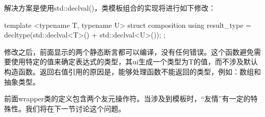 解决方案是使用std::declval()，类模板组合的实现将进行如下修改：

\begin{cppcode}
template <typename T, typename U>
struct composition
{
	using result_type = decltype(std::declval<T>() +
								 std::declval<U>());
};
\end{cppcode}

修改之后，前面显示的两个静态断言都可以编译，没有任何错误。这个函数避免需要使用特定的值来确定表达式的类型，其ui生成一个类型为T的值，而不涉及默认构造函数。返回右值引用的原因是，能够处理函数不能返回的类型，例如：数组和抽象类型。

前面wrapper类的定义包含两个友元操作符。当涉及到模板时，“友情”有一定的特殊性。我们将在下一节讨论这个问题。

















